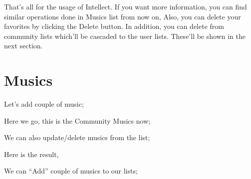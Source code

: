 \documentclass[letterpaper,10pt,english]{sphinxmanual}
\begin{document}
That’s all for the usage of Intellect. If you want more information, you can find similar operations done in Musics list from now on,
Also, you can delete your favorites by clicking the Delete button. In addition, you can delete from community lists which’ll be cascaded to the user lists.
These’ll be shown in the next section.


\section{Musics}
\label{\detokenize{user/index:musics}}
Let’s add couple of music;
\begin{quote}

\begin{figure}[htbp]
\centering

\noindent{}
\end{figure}
\end{quote}

Here we go, this is the Community Musics now;
\begin{quote}

\begin{figure}[htbp]
\centering

\noindent{}
\end{figure}
\end{quote}

We can also update/delete musics from the list;
\begin{quote}

\begin{figure}[htbp]
\centering

\noindent{}
\end{figure}
\end{quote}

Here is the result,
\begin{quote}

\begin{figure}[htbp]
\centering

\noindent{}
\end{figure}
\end{quote}

We can “Add” couple of musics to our lists;
\begin{quote}

\begin{figure}[htbp]
\centering

\noindent{}
\end{figure}
\end{quote}
\end{document}
